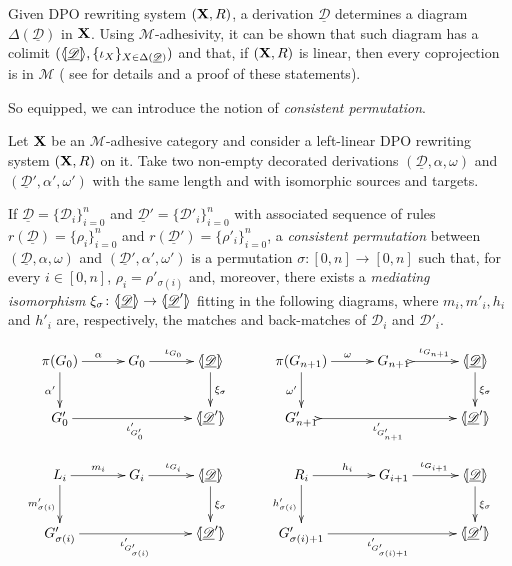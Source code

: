 \documentclass[a4paper,UKenglish,cleveref,pdftex,thm-restate,numberwithinsect,anonymous]{lipics}
\def\R{\mathsf{R}}
\def\X{\textbf {\textup{X}}}
\def\G{\textbf {\textup{G}}}
\newcommand{\dder}[1]{\mathscr{#1}}
\newcommand{\der}[1]{\underline{\dder{#1}}}
\newcommand{\lpro}{\langle \hspace{-1.85pt}[}
\newcommand{\rpro}{]\hspace{-1.85pt}\rangle}
\newcommand{\tpro}[1]{\lpro \der{#1}\rpro}
\begin{document}
Given DPO rewriting system $(\X, \R)$,  a derivation $\der{D}$ determines a diagram
$\Delta(\der{D})$ in $\X$. Using $\mathcal{M}$-adhesivity, it can be shown  that such diagram has a colimit $(\tpro{D}, \{\iota_X\}_{X\in \Delta(\der{D})})$ and that, if $(\X, \R)$ is linear, then every coprojection is in $\mathcal{M}$ ( see  for details and a proof of these statements).


So equipped, we can introduce the notion of \emph{consistent permutation}.

\begin{definition}
  \label{def:permcon}
  Let $\X$ be an $\mathcal{M}$-adhesive category and consider a
  left-linear DPO rewriting system $(\X, \R)$ on it.  Take two
  non-empty decorated derivations $(\der{D}, \alpha, \omega)$ and
  $(\der{D}', \alpha', \omega')$ with the same length and with
  isomorphic sources and targets.

  If $\der{D}=\{\dder{D}_i\}_{i=0}^n$ and
  $\der{D}'=\{\dder{D}'_i\}_{i=0}^n$ with associated sequence of rules
  $r(\der{D})=\{\rho_i\}_{i=0}^n$ and
  $r(\der{D}')=\{\rho'_i\}_{i=0}^n$, a \emph{consistent permutation}
  between $(\der{D}, \alpha, \omega)$ and
  $(\der{D}', \alpha', \omega')$ is a permutation
  $\sigma\colon [0,n]\to [0,n]$ such that, for every $i\in [0,n]$,
  $\rho_i=\rho'_{\sigma(i)}$ and, moreover, there exists a
  \emph{mediating isomorphism}
  $\xi_\sigma\colon \tpro{D} \to \lpro \der{D}' \rpro$ fitting in the
  following diagrams, where $m_i, m'_i, h_i$ and $h'_i$ are,
  respectively, the matches and back-matches of $\dder{D}_i$ and
  $\dder{D}'_i$.

  \[
    \xymatrix@C=30pt{\pi(G_0)\ar[r]^{\alpha} \ar[d]_{\alpha'} & G_0
      \ar[r]^{\iota_{G_0}} &\tpro{D} \ar[d]^{\xi_\sigma}& \pi(G_{n+1})
      \ar[r]^{\omega} \ar[d]_{\omega'} & G_{n+1}
      \ar@{>->}[r]^{\iota_{G_{n+1}}} &\tpro{D} \ar[d]^{\xi_\sigma}\\
      G'_0 \ar[rr]_{\iota'_{G'_0}} & &\lpro \der{D}' \rpro& G'_{n+1}
      \ar@{>->}[rr]_{\iota'_{G'_{n+1}}} & &\lpro \der{D}' \rpro\\L_i
      \ar[r]^{m_i} \ar[d]_{m'_{\sigma(i)}}& G_i \ar[r]^{\iota_{G_i}}
      &\tpro{D} \ar[d]^{\xi_\sigma} & R_i \ar[r]^{h_i}
      \ar[d]_{h'_{\sigma(i)}}& G_{i+1} \ar[r]^{\iota_{G_{i+1}}}
      &\tpro{D} \ar[d]^{\xi_\sigma} \\G'_{\sigma(i)}
      \ar[rr]_{\iota'_{G'_{\sigma(i)}}}&& \lpro \der{D}' \rpro&
      G'_{\sigma(i)+1} \ar[rr]_{\iota'_{G'_{\sigma(i)+1}}}&& \lpro
      \der{D}' \rpro}
  \]
\end{definition}
\end{document}
